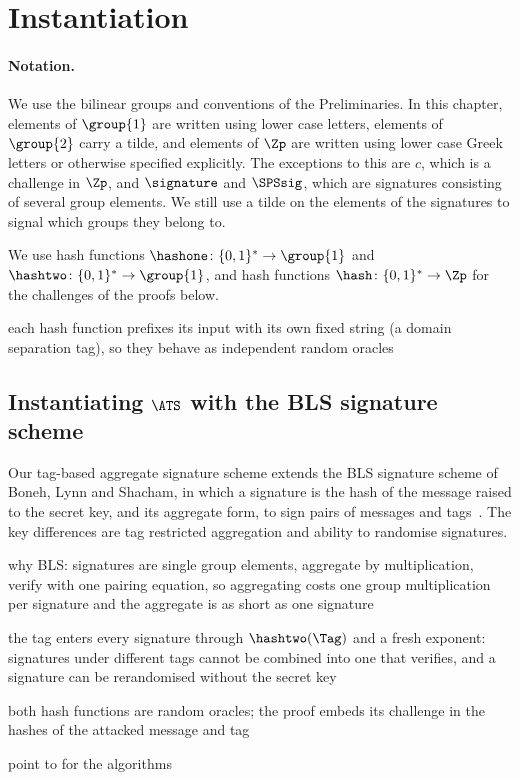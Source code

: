 \section{Instantiation}\label{sec:agg-creds-instantiation}

\paragraph{Notation.} We use the bilinear groups and conventions of the Preliminaries. In this chapter, elements of $\group{1}$ are
written using lower case letters, elements of $\group{2}$ carry a tilde, and
elements of $\Zp$ are written using lower case Greek letters or otherwise
specified explicitly. The exceptions to this are $c$, which is a challenge in
$\Zp$, and $\signature$ and $\SPSsig$, which are signatures consisting of
several group elements. We still use a tilde on the elements of the signatures
to signal which groups they belong to.

We use hash functions $\hashone \colon \{0,1\}^* \rightarrow \group{1}$ and
$\hashtwo \colon \{0,1\}^* \rightarrow \group{1}$, and hash functions $\hash
\colon \{0,1\}^* \rightarrow \Zp$ for the challenges of the proofs below.
\begin{outline}
  \item each hash function prefixes its input with its own fixed string (a domain separation tag), so they behave as independent random oracles
\end{outline}

\subsection{Instantiating $\ATS$ with the BLS signature scheme}\label{sec:agg-creds-tag-scheme}

Our tag-based aggregate signature scheme extends the BLS signature scheme of
Boneh, Lynn and Shacham, in which a signature is the hash of the message raised
to the secret key, and its
aggregate form, to sign pairs of messages and tags~\cite{JC:BonLynSha04,EC:BGLS03}.
The key differences are tag restricted aggregation and ability to randomise
signatures.

\begin{outline}
  \item why BLS: signatures are single group elements, aggregate by multiplication, verify with one pairing equation, so aggregating costs one group multiplication per signature and the aggregate is as short as one signature
  \item the tag enters every signature through $\hashtwo(\Tag)$ and a fresh exponent: signatures under different tags cannot be combined into one that verifies, and a signature can be rerandomised without the secret key
  \item both hash functions are random oracles; the proof embeds its challenge in the hashes of the attacked message and tag
  \item point to  for the algorithms
\end{outline}

